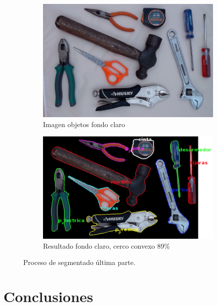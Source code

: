 \documentclass[a4paper, 11pt]{article}
\begin{document}
\begin{figure}[h]
  \begin{subfigure}{0.5\linewidth}
    \includegraphics[width=\linewidth]{resultados_colores/todo_claro}
    \caption{Imagen objetos fondo claro}
    \label{fig:1a}
  \end{subfigure}\hfill
  \begin{subfigure}{0.5\linewidth}
    \includegraphics[width=\linewidth]{resultados_colores/resultado_claro_cconvexo_0_89}
    \caption{Resultado fondo claro, cerco convexo 89\%}
    \label{fig:1a}
  \end{subfigure}
  \caption{Proceso de segmentado última parte.}
  \label{fig:1}
\end{figure}



\newpage
\section{Conclusiones}
\end{document}
